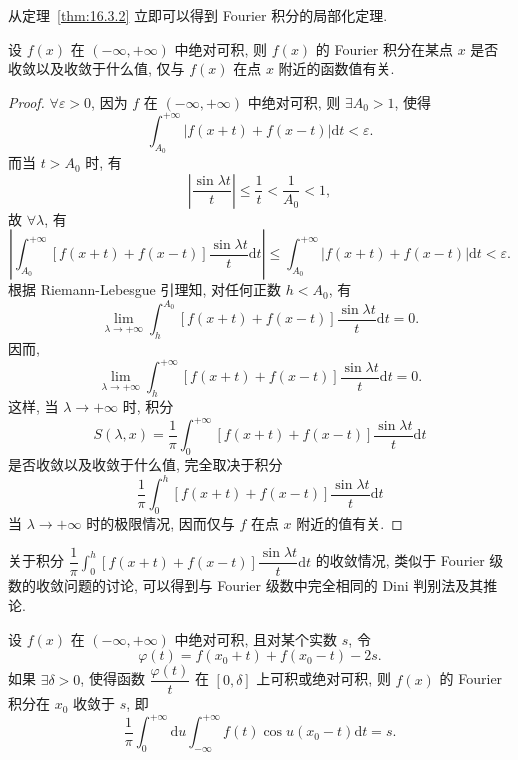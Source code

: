 从定理~\ref{thm:16.3.2} 立即可以得到 Fourier 积分的局部化定理.

\begin{theorem}\label{thm:16.3.3}
设 $f(x)$ 在 $(-\infty,+\infty)$ 中绝对可积, 则 $f(x)$ 的 Fourier 积分在某点 $x$ 是否收敛以及收敛于什么值, 仅与 $f(x)$ 在点 $x$ 附近的函数值有关.
\end{theorem}

\begin{proof}
$\forall\varepsilon>0$, 因为 $f$ 在 $(-\infty,+\infty)$ 中绝对可积, 则 $\exists A_{0}>1$, 使得
\[
  \int_{A_{0}}^{+\infty}|f(x+t)+f(x-t)|\mathrm{d}t<\varepsilon.
\]
而当 $t>A_{0}$ 时, 有
\[
  \left|\frac{\sin\lambda t}{t}\right|\leqslant\frac{1}{t}<\frac{1}{A_{0}}<1,
\]
故 $\forall\lambda$, 有
\[
  \left|\int_{A_{0}}^{+\infty}\left[f(x+t)+f(x-t)\right]\frac{\sin\lambda t}{t}\mathrm{d}t\right|\leqslant\int_{A_{0}}^{+\infty}|f(x+t)+f(x-t)|\mathrm{d}t<\varepsilon.
\]
根据 Riemann-Lebesgue 引理知, 对任何正数 $h<A_{0}$, 有
\[
  \lim_{\lambda\to+\infty}\int_{h}^{A_{0}}\left[f(x+t)+f(x-t)\right]\frac{\sin\lambda t}{t}\mathrm{d}t=0.
\]
因而,
\[
  \lim_{\lambda\to+\infty}\int_{h}^{+\infty}\left[f(x+t)+f(x-t)\right]\frac{\sin\lambda t}{t}\mathrm{d}t=0.
\]
这样, 当 $\lambda\to+\infty$ 时, 积分
\[
  S(\lambda,x)=\frac{1}{\pi}\int_{0}^{+\infty}\left[f(x+t)+f(x-t)\right]\frac{\sin\lambda t}{t}\mathrm{d}t
\]
是否收敛以及收敛于什么值, 完全取决于积分
\[
  \frac{1}{\pi}\int_{0}^{h}\left[f(x+t)+f(x-t)\right]\frac{\sin\lambda t}{t}\mathrm{d}t
\]
当 $\lambda\to+\infty$ 时的极限情况, 因而仅与 $f$ 在点 $x$ 附近的值有关.
\end{proof}

关于积分 $\dfrac{1}{\pi}\displaystyle\int_{0}^{h}[f(x+t)+f(x-t)]\dfrac{\sin\lambda t}{t}\mathrm{d}t$ 的收敛情况, 类似于 Fourier 级数的收敛问题的讨论, 可以得到与 Fourier 级数中完全相同的 Dini 判别法及其推论.

\begin{theorem}\label{thm:16.3.4}
设 $f(x)$ 在 $(-\infty,+\infty)$ 中绝对可积, 且对某个实数 $s$, 令
\[
  \varphi(t)=f(x_{0}+t)+f(x_{0}-t)-2s.
\]
如果 $\exists\delta>0$, 使得函数 $\dfrac{\varphi(t)}{t}$ 在 $[0,\delta]$ 上可积或绝对可积, 则 $f(x)$ 的 Fourier 积分在 $x_{0}$ 收敛于 $s$, 即
\[
  \frac{1}{\pi}\int_{0}^{+\infty}\mathrm{d}u\int_{-\infty}^{+\infty}f(t)\cos u(x_{0}-t)\mathrm{d}t=s.
\]
\end{theorem}


